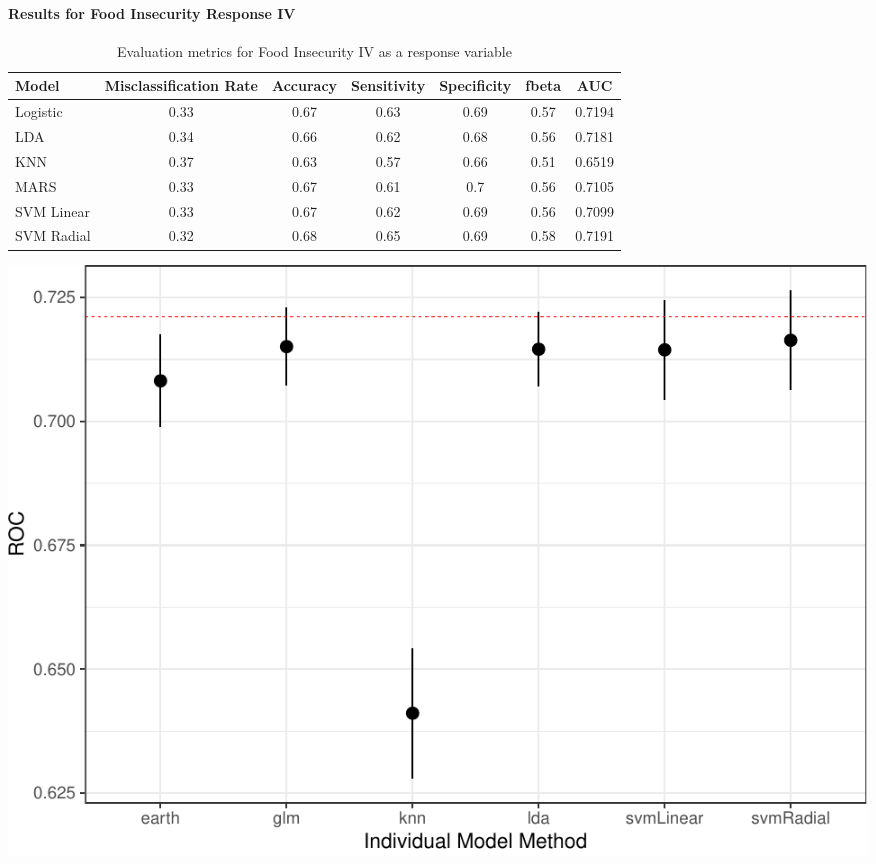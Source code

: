 \documentclass[
  10pt,
]{article}
\begin{document}
\hypertarget{results-for-food-insecurity-response-iv}{%
\paragraph{Results for Food Insecurity Response IV}\label{results-for-food-insecurity-response-iv}}

\begin{table}[H]

\caption{\label{tab:unnamed-chunk-19}Evaluation metrics for Food Insecurity IV  as a response variable}
\centering
\fontsize{12}{14}\selectfont
\begin{tabular}[t]{lcccccc}
\toprule
Model & Misclassification Rate & Accuracy & Sensitivity & Specificity & fbeta & AUC\\
\midrule
Logistic & 0.33 & 0.67 & 0.63 & 0.69 & 0.57 & 0.7194\\
LDA & 0.34 & 0.66 & 0.62 & 0.68 & 0.56 & 0.7181\\
KNN & 0.37 & 0.63 & 0.57 & 0.66 & 0.51 & 0.6519\\
MARS & 0.33 & 0.67 & 0.61 & 0.7 & 0.56 & 0.7105\\
SVM Linear & 0.33 & 0.67 & 0.62 & 0.69 & 0.56 & 0.7099\\
SVM Radial & 0.32 & 0.68 & 0.65 & 0.69 & 0.58 & 0.7191\\
\bottomrule
\end{tabular}
\end{table}

\includegraphics{phase2_report_files/figure-latex/unnamed-chunk-19-1}
\end{document}
